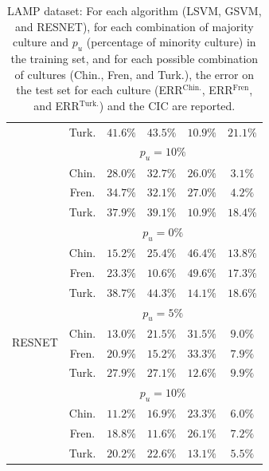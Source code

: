 \begin{table}
\begin{tabular}{c|c|c|c|c|c|}
& Turk. & $41.6\% $ & $43.5\% $ & $10.9\% $ & $21.1\% $ \\
\hhline{~-----}
\multicolumn{1}{c}{} & \multicolumn{5}{c}{$p_u = 10\%$}\\
\hhline{~-----}
& Chin. & $28.0\% $ & $32.7\% $ & $26.0\% $ & $3.1\% $ \\
& Fren.& $34.7\% $ & $32.1\% $ & $27.0\% $ & $4.2\% $ \\
& Turk. & $37.9\% $ & $39.1\% $ & $10.9\% $ & $18.4\% $ \\
\midrule
\multicolumn{1}{c}{\multirow{12}{*}{RESNET}} & \multicolumn{5}{c}{$p_u = 0\%$}\\
\hhline{~-----}
& Chin. & $15.2\% $ & $25.4\% $ & $46.4\% $ & $13.8\% $ \\
& Fren.& $23.3\% $ & $10.6\% $ & $49.6\% $ & $17.3\% $ \\
& Turk. & $38.7\% $ & $44.3\% $ & $14.1\%$ & $18.6\% $ \\
\hhline{~-----}
\multicolumn{1}{c}{} & \multicolumn{5}{c}{$p_u = 5\%$}\\
\hhline{~-----}
& Chin. & $13.0\% $ & $21.5\% $ & $31.5\% $ & $9.0\% $ \\
& Fren.& $20.9\% $ & $15.2\% $ & $33.3\% $ & $7.9\% $ \\
& Turk. & $27.9\% $ & $27.1\% $ & $12.6\% $ & $9.9\% $ \\
\hhline{~-----}
\multicolumn{1}{c}{} & \multicolumn{5}{c}{$p_u = 10\%$} \\
\hhline{~-----}
& Chin. & $11.2\%$ & $16.9\%$ & $23.3\%$ & $6.0\%$ \\
& Fren.& $18.8\%$ & $11.6\%$ & $26.1\%$ & $7.2\%$ \\
& Turk. & $20.2\%$ & $22.6\%$ & $13.1\%$ & $5.5\%$ \\
\bottomrule
\end{tabular}
\caption{LAMP dataset: For each algorithm (LSVM, GSVM, and RESNET), for each combination of majority culture and $p_u$ (percentage of minority culture) in the training set, and for each possible combination of cultures (Chin., Fren, and Turk.), the error on the test set for each culture (ERR$^\text{Chin.}$, ERR$^\text{Fren}$, and ERR$^\text{Turk.}$) and the CIC are reported.}
\label{ch3:tab:ris:ml:lamp}
\end{table}
%
%
